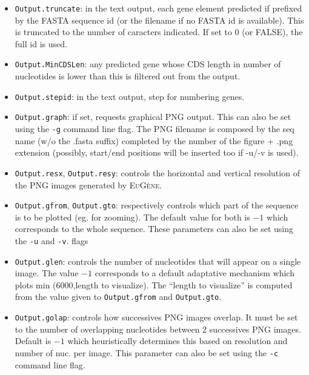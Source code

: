 \documentclass[a4paper,titlepage]{report}
\newcommand{\EuGene}{\textsc{EuG\`ene}}
\begin{document}
\begin{itemize}
\item \texttt{Output.truncate}: in the text output, each gene element
  predicted if prefixed by the FASTA sequence id (or the filename if
  no FASTA id is available). This is truncated to the number of
  caracters indicated. If set to 0 (or FALSE), the full id is used.

\item \texttt{Output.MinCDSLen}: any predicted gene whose CDS length in number of nucleotides is lower than this is
filtered out from the output.

\item \texttt{Output.stepid}: in the text output, step for numbering genes.

\item \texttt{Output.graph}: if set, requests graphical PNG output.
  This can also be set using the \texttt{-g} command line flag. 
  The PNG filename is composed by the seq name (w/o the .fasta suffix) completed by
  the number of the figure + .png extension (possibly,
  start/end positions will be inserted too if -u/-v is used).
  
\item \texttt{Output.resx}, \texttt{Output.resy}: controls the
  horizontal and vertical resolution of the PNG images generated by
  \EuGene. 
  
\item \texttt{Output.gfrom}, \texttt{Output.gto}: respectively
  controls which part of the sequence is to be plotted (eg. for
  zooming). The default value for both is $-1$ which corresponds to
  the whole sequence. These parameters can also be set using the
  \texttt{-u} and \texttt{-v}. flags 

\item \texttt{Output.glen}: controls the number of nucleotides that
  will appear on a single image. The value $-1$ corresponds to a
  default adaptative mechanism which plots min (6000,length to
  visualize). The ``length to visualize'' is computed from the value
  given to \texttt{Output.gfrom} and \texttt{Output.gto}.
  
\item \texttt{Output.golap}: controls how successives PNG images
  overlap. It must be set to the number of overlapping nucleotides
  between 2 successives PNG images. Default is $-1$ which
  heuristically determines this based on resolution and number of nuc.
  per image. This parameter can also be set using the \texttt{-c}
  command line flag. 
    

\end{itemize}
\end{document}
